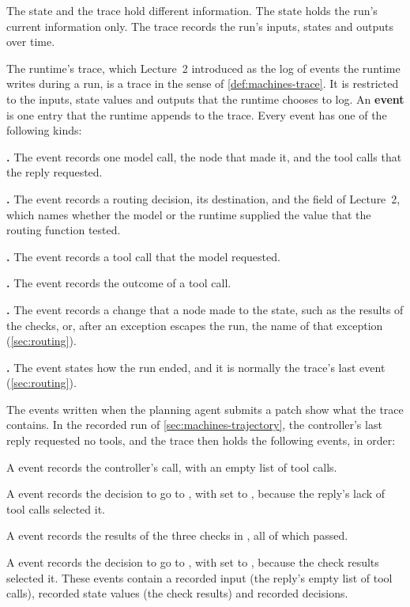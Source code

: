 The state and the trace hold different information. The state holds the run's current information
only. The trace records the run's inputs, states and outputs over time.

The runtime's trace, which Lecture~2 introduced as the log of events the runtime writes during a run,
is a trace in the sense of \cref{def:machines-trace}. It is restricted to the inputs, state values and
outputs that the runtime chooses to log. An \textbf{event} is one entry that the runtime appends to
the trace. Every event has one of the following kinds:
\bi
\item \textbf{.} The event records one model call, the node that made it, and the
tool calls that the reply requested.
\item \textbf{.} The event records a routing decision, its destination, and the
 field of Lecture~2, which names whether the model or the runtime supplied the value that
the routing function tested.
\item \textbf{.} The event records a tool call that the model requested.
\item \textbf{.} The event records the outcome of a tool call.
\item \textbf{.} The event records a change that a node made to the state,
such as the results of the checks, or, after an exception escapes the run, the name of that
exception (\cref{sec:routing}).
\item \textbf{.} The event states how the run ended, and it is normally the
trace's last event (\cref{sec:routing}).
\ei

The events written when the planning agent submits a patch show what the trace contains. In the
recorded run of \cref{sec:machines-trajectory}, the controller's last reply requested no tools, and
the trace then holds the following events, in order:
\be
\item A  event records the controller's call, with an empty list of tool calls.
\item A  event records the decision to go to , with 
set to , because the reply's lack of tool calls selected it.
\item A  event records the results of the three checks in ,
all of which passed.
\item A  event records the decision to go to , with 
set to , because the check results selected it.
\ee
These events contain a recorded input (the reply's empty list of tool calls), recorded state values
(the check results) and recorded decisions.

